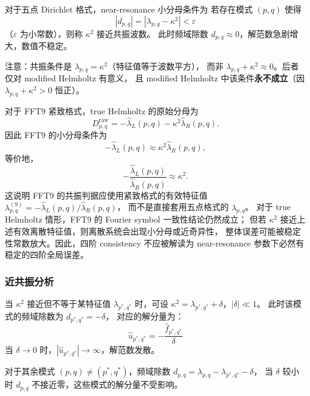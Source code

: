 \begin{definition}
  \label{def:resonance}
  对于五点 Dirichlet 格式，near-resonance 小分母条件为
  若存在模式 $(p,q)$ 使得
  \begin{equation}
    |d_{p,q}|=|\lambda_{p,q} - \kappa^2| < \varepsilon
    \label{eq:resonance_condition}
  \end{equation}
  （$\varepsilon$ 为小常数），则称 $\kappa^2$ 接近共振波数。
  此时频域除数 $d_{p,q} \approx 0$，解范数急剧增大，数值不稳定。

  注意：共振条件是 $\lambda_{p,q} = \kappa^2$（特征值等于波数平方），
  而非 $\lambda_{p,q} + \kappa^2 \approx 0$。后者仅对 modified Helmholtz 有意义，
  且 modified Helmholtz 中该条件\textbf{永不成立}（因 $\lambda_{p,q}+\kappa^2 > 0$ 恒正）。

  对于 FFT9 紧致格式，true Helmholtz 的原始分母为
  \[
  D_{p,q}^{\mathrm{raw}}
  =
  -\hat{\lambda}_L(p,q)-\kappa^2\hat{\lambda}_R(p,q).
  \]
  因此 FFT9 的小分母条件为
  \[
  -\hat{\lambda}_L(p,q)\approx \kappa^2\hat{\lambda}_R(p,q),
  \]
  等价地，
  \[
  -\frac{\hat{\lambda}_L(p,q)}{\hat{\lambda}_R(p,q)}
  \approx
  \kappa^2.
  \]
  这说明 FFT9 的共振判据应使用紧致格式的有效特征值
  $\lambda^{(9)}_{p,q}=-\hat{\lambda}_L(p,q)/\hat{\lambda}_R(p,q)$，
  而不是直接套用五点格式的 $\lambda_{p,q}$。
  对于 true Helmholtz 情形，FFT9 的 Fourier symbol 一致性结论仍然成立；
  但若 $\kappa^2$ 接近上述有效离散特征值，则离散系统会出现小分母或近奇异性，
  整体误差可能被稳定性常数放大。因此，四阶 consistency 不应被解读为
  near-resonance 参数下必然有稳定的四阶全局误差。
\end{definition}

\subsubsection{近共振分析}

当 $\kappa^2$ 接近但不等于某特征值 $\lambda_{p^*,q^*}$ 时，可设
$\kappa^2 = \lambda_{p^*,q^*} + \delta$，$|\delta| \ll 1$。
此时该模式的频域除数为 $d_{p^*,q^*} = -\delta$，
对应的解分量为：
\begin{equation}
  \hat{u}_{p^*,q^*} = -\frac{\hat{f}_{p^*,q^*}}{\delta}
\end{equation}
当 $\delta \to 0$ 时，$|\hat{u}_{p^*,q^*}| \to \infty$，解范数发散。

对于其余模式 $(p,q) \neq (p^*,q^*)$，频域除数 $d_{p,q} = \lambda_{p,q}-\lambda_{p^*,q^*}-\delta$，
当 $\delta$ 较小时 $d_{p,q}$ 不接近零，这些模式的解分量不受影响。

